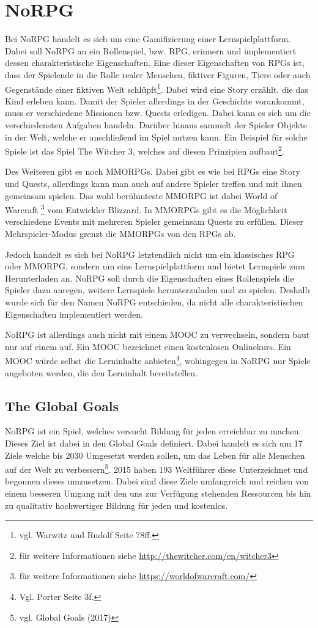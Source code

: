 \chapter{NoRPG}		
Bei NoRPG handelt es sich um eine Gamifizierung einer Lernspielplattform. Dabei soll NoRPG an ein Rollenspiel, bzw. \acf{RPG}, erinnern und implementiert dessen charakteristische Eigenschaften. Eine dieser Eigenschaften von \acsp{RPG} ist, dass der Spielende in die Rolle realer Menschen, fiktiver Figuren, Tiere oder auch Gegenstände einer fiktiven Welt schlüpft\footnote{vgl. Warwitz und Rudolf \cite{rpgSinn} Seite 78ff.}. Dabei wird eine Story erzählt, die das Kind erleben kann. Damit der Spieler allerdings in der Geschichte vorankommt, muss er verschiedene Missionen bzw. Quests erledigen. Dabei kann es sich um die verschiedensten Aufgaben handeln. Darüber hinaus sammelt der Spieler Objekte in der Welt, welche er anschließend im Spiel nutzen kann. Ein Beispiel für solche Spiele ist das Spiel The Witcher 3, welches auf diesen Prinzipien aufbaut\footnote{für weitere Informationen siehe \url{http://thewitcher.com/en/witcher3}}.
	
Des Weiteren gibt es noch \acfp{MMORPG}. Dabei gibt es wie bei \acsp{RPG} eine Story und Quests, allerdings kann man auch auf andere Spieler treffen und mit ihnen gemeinsam spielen. Das wohl berühmteste MMORPG ist dabei World of Warcraft \footnote{für weitere Informationen siehe \url{https://worldofwarcraft.com/}} vom Entwickler Blizzard. In MMORPGs gibt es die Möglichkeit verschiedene Events mit mehreren Spieler gemeinsam Quests zu erfüllen. Dieser Mehrspieler-Modus grenzt die \acsp{MMORPG} von den \acsp{RPG} ab.

Jedoch handelt es sich bei NoRPG letztendlich nicht um ein klassisches \ac{RPG} oder \ac{MMORPG}, sondern um eine Lernspielplattform und bietet Lernspiele zum Herunterladen an. NoRPG soll durch die Eigenschaften eines Rollenspiels die Spieler dazu anregen, weitere Lernspiele herunterzuladen und zu spielen. Deshalb wurde sich für den Namen NoRPG entschieden, da nicht alle charakteristischen Eigenschaften implementiert werden.

NoRPG ist allerdings auch nicht mit einem \acf{MOOC} zu verwechseln, sondern baut nur auf einem auf. Ein \ac{MOOC} bezeichnet einen kostenlosen Onlinekurs. Ein \ac{MOOC} würde selbst die Lerninhalte anbieten\footnote{Vgl. Porter \cite{moocBook} Seite 3f.}, wohingegen in NoRPG nur Spiele angeboten werden, die den Lerninhalt bereitstellen.

\section{The Global Goals}
NoRPG ist ein Spiel, welches versucht Bildung für jeden erreichbar zu machen. Dieses Ziel ist dabei in den Global Goals definiert. Dabei handelt es sich um 17 Ziele welche bis 2030 Umgesetzt werden sollen, um das Leben für alle Menschen auf der Welt zu verbessern\footnote{vgl. Global Goals \cite{global} (2017)}. 2015 haben 193 Weltführer diese Unterzeichnet und begonnen dieses umzusetzen. Dabei sind diese Ziele umfangreich und reichen von einem besseren Umgang mit den uns zur Verfügung stehenden Ressourcen bis hin zu qualitativ hochwertiger Bildung für jeden und kostenlos.

